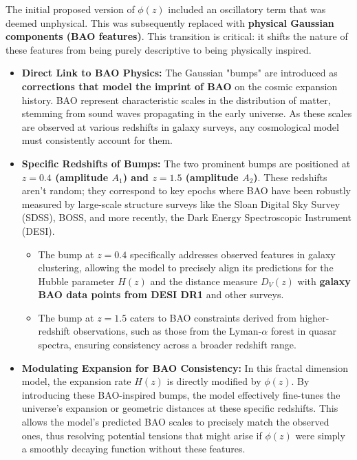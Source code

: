\documentclass{article}
\begin{document}
The initial proposed version of $\phi(z)$ included an oscillatory term that was deemed unphysical. This was subsequently replaced with \textbf{physical Gaussian components (BAO features)}. This transition is critical: it shifts the nature of these features from being purely descriptive to being physically inspired.
\begin{itemize}
    \item \textbf{Direct Link to BAO Physics:} The Gaussian "bumps" are introduced as \textbf{corrections that model the imprint of BAO} on the cosmic expansion history. BAO represent characteristic scales in the distribution of matter, stemming from sound waves propagating in the early universe. As these scales are observed at various redshifts in galaxy surveys, any cosmological model must consistently account for them.
    \item \textbf{Specific Redshifts of Bumps:} The two prominent bumps are positioned at \textbf{$z=0.4$ (amplitude $A_1$) and $z=1.5$ (amplitude $A_2$)}. These redshifts aren't random; they correspond to key epochs where BAO have been robustly measured by large-scale structure surveys like the Sloan Digital Sky Survey (SDSS), BOSS, and more recently, the Dark Energy Spectroscopic Instrument (DESI).
        \begin{itemize}
            \item The bump at $z=0.4$ specifically addresses observed features in galaxy clustering, allowing the model to precisely align its predictions for the Hubble parameter $H(z)$ and the distance measure $D_V(z)$ with \textbf{galaxy BAO data points from DESI DR1} and other surveys.
            \item The bump at $z=1.5$ caters to BAO constraints derived from higher-redshift observations, such as those from the Lyman-$\alpha$ forest in quasar spectra, ensuring consistency across a broader redshift range.
        \end{itemize} %
    \item \textbf{Modulating Expansion for BAO Consistency:} In this fractal dimension model, the expansion rate $H(z)$ is directly modified by $\phi(z)$. By introducing these BAO-inspired bumps, the model effectively fine-tunes the universe's expansion or geometric distances at these specific redshifts. This allows the model's predicted BAO scales to precisely match the observed ones, thus resolving potential tensions that might arise if $\phi(z)$ were simply a smoothly decaying function without these features.
\end{itemize} %
\end{document}
